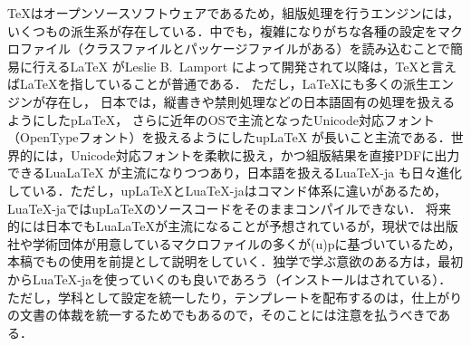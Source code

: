 {\TeX}はオープンソースソフトウェアであるため，組版処理を行うエンジンには，いくつもの派生系が存在している．中でも，複雑になりがちな各種の設定をマクロファイル（クラスファイルとパッケージファイルがある）を読み込むことで簡易に行える{\LaTeX} \cite{latex}がLeslie B.\ Lamport によって開発されて以降は，{\TeX}と言えば{\LaTeX}を指していることが普通である．
ただし，{\LaTeX}にも多くの派生エンジンが存在し，
日本では，縦書きや禁則処理などの日本語固有の処理を扱えるようにした{p\LaTeX}\cite{ptex}，
さらに近年のOSで主流となったUnicode対応フォント（OpenTypeフォント）\cite{unicode}\cite{opntyp}を扱えるようにした{up\LaTeX} \cite{uptex}が長いこと主流である．世界的には，Unicode対応フォントを柔軟に扱え，かつ組版結果を直接PDFに出力できる{Lua\LaTeX} \cite{luatex}が主流になりつつあり，日本語を扱える{Lua\TeX-ja} \cite{luatexj}も日々進化している．ただし，{up\LaTeX}と{Lua\TeX-ja}はコマンド体系に違いがあるため，{Lua\TeX-ja}では{up\LaTeX}のソースコードをそのままコンパイルできない．
将来的には日本でも{Lua\LaTeX}が主流になることが予想されているが，現状では出版社や学術団体が用意しているマクロファイルの多くが{(u)p\LaTeXe}に基づいているため，本稿でも{の使用を前提}として説明をしていく．独学で学ぶ意欲のある方は，最初から{Lua\TeX-ja}を使っていくのも良いであろう（インストールはされている）．ただし，学科として設定を統一したり，テンプレートを配布するのは，仕上がりの文書の体裁を統一するためでもあるので，そのことには注意を払うべきである．

